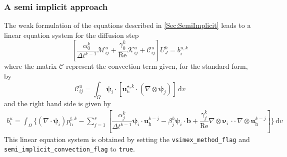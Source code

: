 \documentclass[]{scrartcl}
\renewcommand{\d}{\,\mathrm{d}}
\newcommand{\bs}[1]{\boldsymbol{#1}}
\newcommand{\cdott}{\, {\cdot}{\cdot}\,}
\begin{document}
\subsubsection{A semi implicit approach}
The weak formulation of the equations described in \cref{Sec:SemiImplicit} leads to a linear equation system for the diffusion step
\begin{equation*}
	\left[
	\dfrac{\alpha_0^k}{\Delta t^{k-1}} 
	\mathcal{M}^u_{ij}
	+
	\dfrac{\gamma_0^k}{\textrm{Re}}
	\mathcal{K}^u_{ij}
	+
	\mathcal{C}^u_{ij}
	\right]
	U^k_J
	= 
	b^{u, k}_i
\end{equation*}
where the matrix $\mathcal{C}$ represent the convection term given, for the standard form, by
\begin{equation*}
	\mathcal{C}^u_{ij}
	=
	\int_{\Omega}
	\bs{\psi}_i \cdot [\bs{u}^{\star,k}_\textrm{h} \cdot (\nabla \otimes \bs{\psi}_j)]
	\d v
\end{equation*}
and the right hand side is given by
\begin{equation*}
	\begin{split}
		b^u_i = \int_{\Omega}
		\Bigg\lbrace
		(\nabla \cdot \bs{\psi}_i) p^{\sharp, k}_\textrm{h}
		-\sum_{j=1}^{s} 
		\left[
		\dfrac{\alpha_j^k}{\Delta t^{k-1}} \bs{\psi}_i \cdot \bs{u}^{k-j}_\textrm{h}
		-
		\beta_j^k \bs{\psi}_i \cdot \bs{b}
		+
		\dfrac{\gamma_j^k}{\textrm{Re}} \nabla \otimes \bs{\nu}_i \cdott \nabla \otimes \bs{u}^{k-j}_\textrm{h}
		\right]\Bigg\rbrace
		\d v
	\end{split}
\end{equation*}
This linear equation system is obtained by setting the \texttt{vsimex\_method\_flag} and \\ \texttt{semi\_implicit\_convection\_flag} to \texttt{true}.
\end{document}
